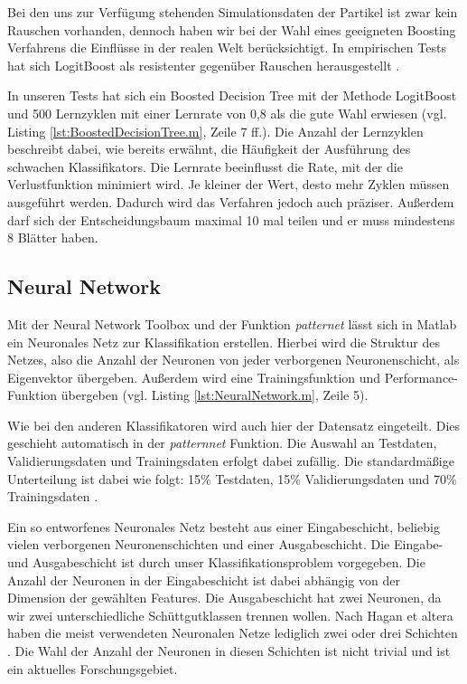 Bei den uns zur Verfügung stehenden Simulationsdaten der Partikel ist zwar kein Rauschen vorhanden, dennoch haben wir bei der Wahl eines geeigneten Boosting Verfahrens die Einflüsse in der realen Welt berücksichtigt. In empirischen Tests hat sich LogitBoost als resistenter gegenüber Rauschen herausgestellt \cite{McDonald2003}.

In unseren Tests hat sich ein Boosted Decision Tree mit der Methode LogitBoost und 500 Lernzyklen mit einer Lernrate von 0,8 als die gute Wahl erwiesen (vgl. Listing \ref{lst:BoostedDecisionTree.m}, Zeile 7 ff.). Die Anzahl der Lernzyklen beschreibt dabei, wie bereits erwähnt, die Häufigkeit der Ausführung des schwachen Klassifikators. Die Lernrate beeinflusst die Rate, mit der die Verlustfunktion minimiert wird. Je kleiner der Wert, desto mehr Zyklen müssen ausgeführt werden. Dadurch wird das Verfahren jedoch auch präziser.   
Außerdem darf sich der Entscheidungsbaum maximal 10 mal teilen und er muss mindestens 8 Blätter haben.

\begin{minipage}{\textwidth}

\end{minipage}

\subsection{Neural Network} \label{NN}
Mit der Neural Network Toolbox und der Funktion \textit{patternet} lässt sich in Matlab ein Neuronales Netz zur Klassifikation erstellen. Hierbei wird die Struktur des Netzes, also die Anzahl der Neuronen von jeder verborgenen Neuronenschicht, als Eigenvektor übergeben. Außerdem wird eine Trainingsfunktion und Performance-Funktion übergeben (vgl. Listing \ref{lst:NeuralNetwork.m}, Zeile 5).

Wie bei den anderen Klassifikatoren wird auch hier der Datensatz eingeteilt. Dies geschieht automatisch in der \textit{patternnet} Funktion. Die Auswahl an Testdaten, Validierungsdaten und Trainingsdaten erfolgt dabei zufällig. Die standardmäßige Unterteilung ist dabei wie folgt: 15\% Testdaten, 15\% Validierungsdaten und 70\% Trainingsdaten \cite{NNDivideData}.

Ein so entworfenes Neuronales Netz besteht aus einer Eingabeschicht, beliebig vielen verborgenen Neuronenschichten und einer Ausgabeschicht. Die Eingabe- und Ausgabeschicht ist durch unser Klassifikationsproblem vorgegeben. Die Anzahl der Neuronen in der Eingabeschicht ist dabei abhängig von der Dimension der gewählten Features. Die Ausgabeschicht hat zwei Neuronen, da wir zwei unterschiedliche Schüttgutklassen trennen wollen. Nach Hagan et altera haben die meist verwendeten Neuronalen Netze lediglich zwei oder drei Schichten
\cite{NNDesign}. Die Wahl der Anzahl der Neuronen in diesen Schichten ist nicht trivial und ist ein aktuelles Forschungsgebiet.

